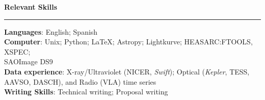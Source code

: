 \documentclass[letter,12pt]{article}
\begin{document}
\newpage
\noindent
{\bf Relevant Skills} \\
\vspace{-10mm}
\begin{center}
\rule{\textwidth}{0.2mm}
\end{center}
\vspace{-3mm}
\noindent
\textbf{Languages}: English; Spanish\\
\textbf{Computer}: Unix; Python; LaTeX; Astropy; Lightkurve; HEASARC:FTOOLS, XSPEC; \\ SAOImage DS9 \\
\textbf{Data experience}: X-ray/Ultraviolet (NICER, {\it Swift}); Optical ({\it Kepler}, TESS, AAVSO, DASCH), and Radio (VLA) time series \\
\textbf{Writing Skills}: Technical writing; Proposal writing \\
\end{document}

